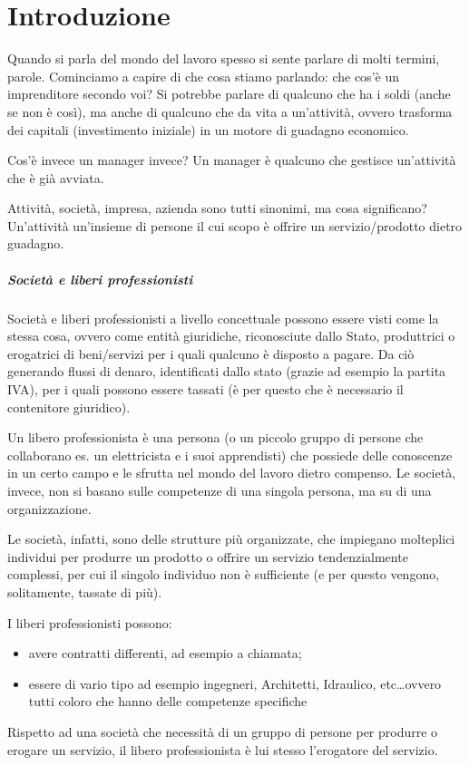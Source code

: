 \chapter{Introduzione}

Quando si parla del mondo del lavoro spesso si sente parlare di molti termini,
parole. Cominciamo a capire di che cosa stiamo parlando: che cos'è un
imprenditore secondo voi? Si potrebbe parlare di qualcuno che ha i soldi (anche
se non è così), ma anche di qualcuno che da vita a un'attività, ovvero
trasforma dei capitali (investimento iniziale) in un motore di guadagno
economico.

Cos'è invece un manager invece? Un manager è qualcuno che gestisce un'attività
che è già avviata.

Attività, società, impresa, azienda sono tutti sinonimi, ma cosa significano?
Un'attività un'insieme di persone il cui scopo è offrire un servizio/prodotto
dietro guadagno.

\paragraph*{Società e liberi professionisti} Società e liberi professionisti a
livello concettuale possono essere visti come la stessa cosa, ovvero come
entità giuridiche, riconosciute dallo Stato, produttrici o erogatrici di
beni/servizi per i quali qualcuno è disposto a pagare. Da ciò generando flussi
di denaro, identificati dallo stato (grazie ad esempio la partita IVA), per i
quali possono essere tassati (è per questo che è necessario il contenitore
giuridico).

Un libero professionista è una persona (o un piccolo gruppo di persone che
collaborano es. un elettricista e i suoi apprendisti) che possiede delle
conoscenze in un certo campo e le sfrutta nel mondo del lavoro dietro compenso.
Le società, invece, non si basano sulle competenze di una singola persona, ma su
di una organizzazione.

Le società, infatti, sono delle strutture più organizzate, che
impiegano molteplici individui per produrre un prodotto o offrire un servizio
tendenzialmente complessi, per cui il singolo individuo non è
sufficiente (e per questo vengono, solitamente, tassate di più).

I liberi professionisti possono:
\begin{itemize}
  \item avere contratti differenti, ad esempio a chiamata;
  \item essere di vario tipo ad esempio ingegneri, Architetti, Idraulico,
  etc\dots ovvero tutti coloro che hanno delle competenze specifiche
\end{itemize}
Rispetto ad una società che necessità di un gruppo di persone per produrre o
erogare un servizio, il libero professionista è lui stesso l'erogatore del
servizio.

